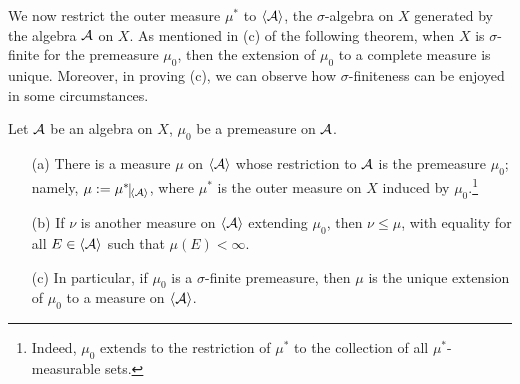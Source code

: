 We now restrict the outer measure $\mu^*$ to ${\left\langle{{\mathcal{A}}}\right\rangle}$, the $\sigma$-algebra on $X$ generated by the algebra ${\mathcal{A}}$ on $X$.
As mentioned in (c) of the following theorem, when $X$ is $\sigma$-finite for the premeasure $\mu_0$, then the extension of $\mu_0$ to a complete measure is unique.
Moreover, in proving (c), we can observe how $\sigma$-finiteness can be enjoyed in some circumstances.
\begin{thm}
    Let ${\mathcal{A}}$ be an algebra on $X$, $\mu_0$ be a premeasure on ${\mathcal{A}}$.
    \begin{enumerate}
        \item[(a)]
        {
            There is a measure $\mu$ on ${\left\langle{{\mathcal{A}}}\right\rangle}$ whose restriction to ${\mathcal{A}}$ is the premeasure $\mu_0$; namely, $\mu:=\mu^*\vline_\genone{\mc{A}}$, where $\mu^*$ is the outer measure on $X$ induced by $\mu_0$.\footnote{Indeed, $\mu_0$ extends to the restriction of $\mu^*$ to the collection of all $\mu^*$-measurable sets.}
        }
        \item[(b)]
        {
            If $\nu$ is another measure on ${\left\langle{{\mathcal{A}}}\right\rangle}$ extending $\mu_0$, then $\nu\leq\mu$, with equality for all $E\in{\left\langle{{\mathcal{A}}}\right\rangle}$ such that $\mu(E)<\infty$.
            }
        \item[(c)]
        {
            In particular, if $\mu_0$ is a $\sigma$-finite premeasure, then $\mu$ is the unique extension of $\mu_0$ to a measure on ${\left\langle{{\mathcal{A}}}\right\rangle}$.
        }
    \end{enumerate}
\end{thm}
